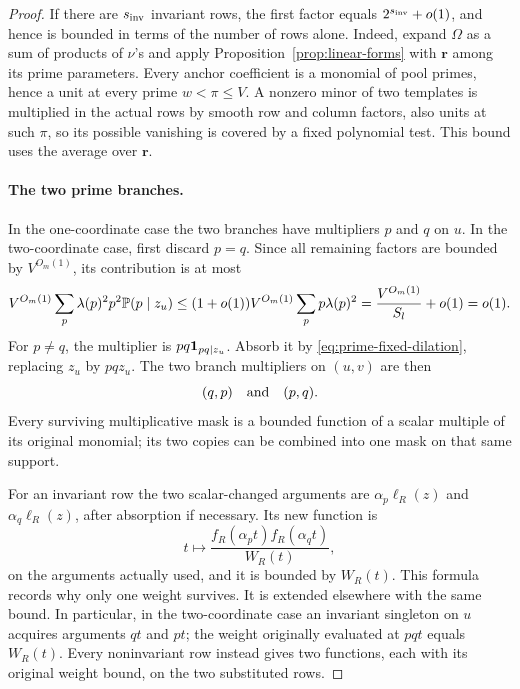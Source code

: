 \begin{proof}
If there are $s_{\rm inv}$ invariant rows, the first factor equals
$2^{s_{\rm inv}}+o(1)$, and hence is bounded in terms of the number of
rows alone. Indeed, expand $\Omega$ as a sum of products of $\nu$'s
and apply Proposition~\ref{prop:linear-forms} with $\boldsymbol r$
among its prime parameters. Every anchor coefficient is a monomial
of pool primes, hence a unit at every prime $w<\pi\le V$. A nonzero
minor of two templates is multiplied in the actual rows by smooth
row and column factors, also units at such $\pi$, so its possible
vanishing is covered by a fixed polynomial test. This bound uses
the average over $\boldsymbol r$.

\paragraph{The two prime branches.}
In the one-coordinate case the two branches have multipliers $p$ and
$q$ on $u$.  In the two-coordinate case, first discard $p=q$.
Since all remaining factors are bounded by $V^{O_m(1)}$, its contribution
is at most
\[
 V^{O_m(1)}\sum_p\lambda(p)^2p^2\mathbb P(p\mid z_u)
 \le (1+o(1))V^{O_m(1)}\sum_p p\lambda(p)^2
 =\frac{V^{O_m(1)}}{S_l}+o(1)=o(1).
\]
For $p\ne q$, the multiplier is $pq\mathbf 1_{pq\mid z_u}$.
Absorb it by \eqref{eq:prime-fixed-dilation}, replacing $z_u$ by
$pqz_u$.  The two branch multipliers on $(u,v)$ are then
\begin{equation}
 (q,p)\quad\hbox{and}\quad(p,q).
 \label{eq:prime-two-branches}
\end{equation}
Every surviving multiplicative mask is a bounded function of a scalar
multiple of its original monomial; its two copies can be combined into
one mask on that same support.

For an invariant row the two scalar-changed arguments are
$\alpha_p\ell_R(z)$ and $\alpha_q\ell_R(z)$, after absorption if
necessary.  Its new function is
\[
 t\longmapsto
 \frac{f_R(\alpha_p t)f_R(\alpha_q t)}{W_R(t)},
\]
on the arguments actually used, and it is bounded by $W_R(t)$.
This formula records why only one weight survives.  It is extended
elsewhere with the same bound.  In particular, in the two-coordinate
case an invariant singleton on $u$ acquires arguments $qt$ and $pt$;
the weight originally evaluated at $pqt$ equals $W_R(t)$.
Every noninvariant row instead gives two functions, each with its
original weight bound, on the two substituted rows.


\end{proof}
